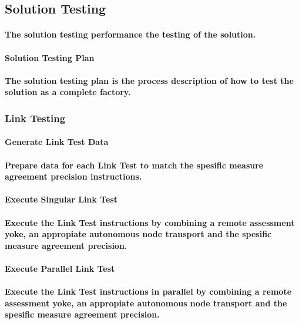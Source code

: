 \subsection{Solution Testing}
\paragraph{The solution testing performance the testing of the solution.}
\paragraph{Solution Testing Plan}
\paragraph{The solution testing plan is the process description of how to test the solution as a complete factory.}
\subsubsection{Link Testing}
\paragraph{Generate Link Test Data}
\paragraph{Prepare data for each Link Test to match the spesific measure agreement precision instructions.}
\paragraph{Execute Singular Link Test}
\paragraph{Execute the Link Test instructions by combining a remote assessment yoke, an appropiate autonomous node transport and the spesific measure agreement precision.}
\paragraph{Execute Parallel Link Test}
\paragraph{Execute the Link Test instructions in parallel by combining a remote assessment yoke, an appropiate autonomous node transport and the spesific measure agreement precision.}
